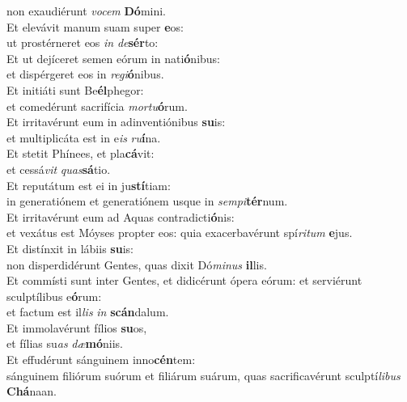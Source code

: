 \oddverse non exaudiérunt \textit{vo}\textit{cem} \textbf{Dó}mini.\\
\evenverse Et elevávit manum suam super \textbf{e}os:~\*\\
\evenverse ut prostérneret eos \textit{in} \textit{de}\textbf{sér}to:\\
\oddverse Et ut dejíceret semen eórum in nati\textbf{ó}nibus:~\*\\
\oddverse et dispérgeret eos in \textit{re}\textit{gi}\textbf{ó}nibus.\\
\evenverse Et initiáti sunt Be\textbf{él}phegor:~\*\\
\evenverse et comedérunt sacrifícia \textit{mor}\textit{tu}\textbf{ó}rum.\\
\oddverse Et irritavérunt eum in adinventiónibus \textbf{su}is:~\*\\
\oddverse et multiplicáta est in e\textit{is} \textit{ru}\textbf{í}na.\\
\evenverse Et stetit Phínees, et pla\textbf{cá}vit:~\*\\
\evenverse et cessá\textit{vit} \textit{quas}\textbf{sá}tio.\\
\oddverse Et reputátum est ei in ju\textbf{stí}tiam:~\*\\
\oddverse in generatiónem et generatiónem usque in \textit{sem}\textit{pi}\textbf{tér}num.\\
\evenverse Et irritavérunt eum ad Aquas contradicti\textbf{ó}nis:~\*\\
\evenverse et vexátus est Móyses propter eos: quia exacerbavérunt spí\textit{ri}\textit{tum} \textbf{e}jus.\\
\oddverse Et distínxit in lábiis \textbf{su}is:~\*\\
\oddverse non disperdidérunt Gentes, quas dixit Dó\textit{mi}\textit{nus} \textbf{il}lis.\\
\evenverse Et commísti sunt inter Gentes, et didicérunt ópera eórum: et serviérunt sculptílibus e\textbf{ó}rum:~\*\\
\evenverse et factum est il\textit{lis} \textit{in} \textbf{scán}dalum.\\
\oddverse Et immolavérunt fílios \textbf{su}os,~\*\\
\oddverse et fílias su\textit{as} \textit{dæ}\textbf{mó}niis.\\
\evenverse Et effudérunt sánguinem inno\textbf{cén}tem:~\*\\
\evenverse sánguinem filiórum suórum et filiárum suárum, quas sacrificavérunt sculptí\textit{li}\textit{bus} \textbf{Chá}naan.\\
